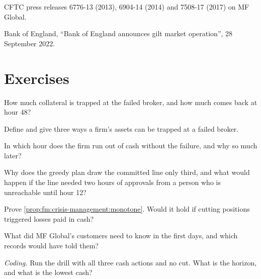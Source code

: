 \begin{omsources}
\item CFTC press releases 6776-13 (2013), 6904-14 (2014) and 7508-17 (2017) on MF Global.
\item Bank of England, ``Bank of England announces gilt market operation'', 28 September 2022.
\end{omsources}

\section{Exercises}

\begin{exercise}[$\star$]\label{exo:fm:crisis-management:1}
How much collateral is trapped at the failed broker, and how much comes back at hour 48?
\end{exercise}

\begin{exercise}[$\star$]\label{exo:fm:crisis-management:2}
Define  and give three ways a firm's assets can be trapped at a failed broker.
\end{exercise}

\begin{exercise}[$\star$]\label{exo:fm:crisis-management:3}
In which hour does the firm run out of cash without the failure, and why so much later?
\end{exercise}

\begin{exercise}[$\star\star$]\label{exo:fm:crisis-management:4}
Why does the greedy plan draw the committed line only third, and what would happen if the line needed two hours of approvals from a person who is
unreachable until hour 12?
\end{exercise}

\begin{exercise}[$\star\star$]\label{exo:fm:crisis-management:5}
Prove \cref{prop:fm:crisis-management:monotone}. Would it hold if cutting positions triggered losses paid in cash?
\end{exercise}

\begin{exercise}[$\star\star$]\label{exo:fm:crisis-management:6}
What did MF Global's customers need to know in the first days, and which records would have told them?
\end{exercise}

\begin{exercise}[$\star\star\star$]\label{exo:fm:crisis-management:7}
\emph{Coding.} Run the drill with all three cash actions and no cut. What is the horizon, and what is the lowest cash?
\end{exercise}

